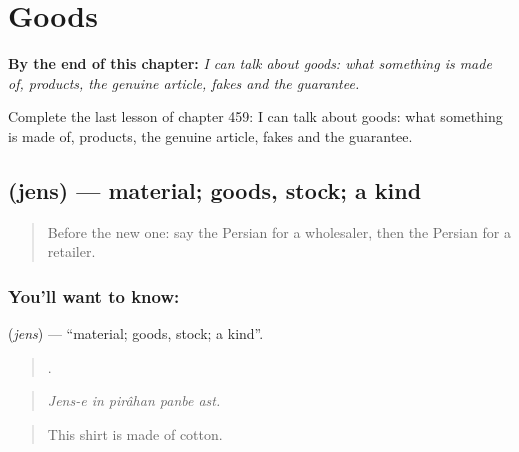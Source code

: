 
\chapter{Goods}
\label{ch:fa-goods}

\begin{chapteropening}
\textbf{By the end of this chapter:} \emph{I can talk about goods: what something is made of, products, the genuine article, fakes and the guarantee.}

Complete the last lesson of chapter 459: I can talk about goods: what something is made of, products, the genuine article, fakes and the guarantee.
\end{chapteropening}

\section[\texorpdfstring{\fa{جنس} (jens)}{جنس (jens)}]{ (jens) — material; goods, stock; a kind}

\label{lesson:FA-C459-jens}



\begin{quote}
Before the new one: say the Persian for a wholesaler, then the Persian for a retailer.
\end{quote}

\subsection*{You'll want to know: }
\textbf{} (\emph{jens}) — \textquotedblleft{}material; goods, stock; a kind\textquotedblright{}.

\begin{quote}
    .
\end{quote}

\begin{quote}
\emph{Jens-e in pirâhan panbe ast.}
\end{quote}

\begin{quote}
This shirt is made of cotton.
\end{quote}

